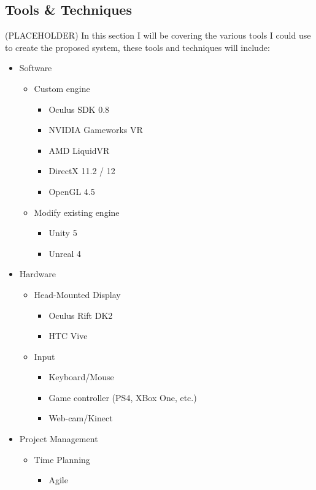 \begin{multicols*}{2}
	\subsection{Tools \& Techniques}
	\label{lr:cross:tools}
		(PLACEHOLDER) In this section I will be covering the various tools I could use to create the proposed system, these tools and techniques will include:
		\begin{itemize}
			\item Software 
			\begin{itemize}
				\item Custom engine
				\begin{itemize}
					\item Oculus SDK 0.8
					\item NVIDIA Gameworks VR
					\item AMD LiquidVR
					\item DirectX 11.2 / 12
					\item OpenGL 4.5
				\end{itemize}
				\item Modify existing engine
				\begin{itemize}
					\item Unity 5
					\item Unreal 4
				\end{itemize}
			\end{itemize}
			\item Hardware
			\begin{itemize}
				\item Head-Mounted Display
				\begin{itemize}
					\item Oculus Rift DK2
					\item HTC Vive
				\end{itemize}
				\item Input
				\begin{itemize}
					\item Keyboard/Mouse
					\item Game controller (PS4, XBox One, etc.)
					\item Web-cam/Kinect
				\end{itemize}
			\end{itemize}
			\item Project Management
			\begin{itemize}
				\item Time Planning
				\begin{itemize}
					\item Agile

\end{itemize}
\end{itemize}
\end{itemize}
\end{multicols*}
